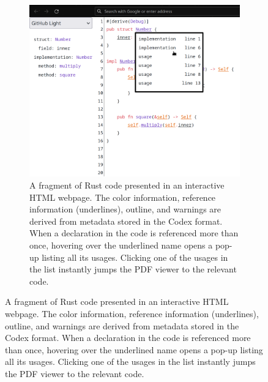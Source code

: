 %
%
\begin{figure}[ht]
    \centering
    \begin{subfigure}[b]{0.49\textwidth}
        \centering
        \includegraphics[width=\textwidth]{../images/codex-html}
        \caption{
            A fragment of Rust code presented in an interactive HTML webpage.
            The color information, reference information (underlines), outline, and warnings are derived from metadata stored in the Codex format.
            When a declaration in the code is referenced more than once, hovering over the underlined name opens a pop-up listing all its usages.
            Clicking one of the usages in the list instantly jumps the PDF viewer to the relevant code.
        }%
        \label{fig:demo.html}

\end{subfigure}
\end{figure}
